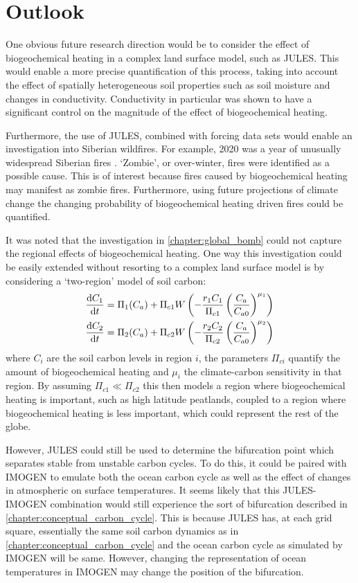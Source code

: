 \section{Outlook}
One obvious future research direction would be to consider the effect of biogeochemical heating in a complex land surface model, such as JULES.
This would enable a more precise quantification of this process, taking into account the effect of spatially heterogeneous soil properties such as
soil moisture and changes in conductivity. Conductivity in particular was shown to have a significant control on the magnitude of the effect of biogeochemical heating.

Furthermore, the use of JULES, combined with forcing data sets would enable an investigation into Siberian wildfires. For example, 2020 was a year of unusually widespread
Siberian fires \parencite{Witze2020}. `Zombie', or over-winter, fires were identified as a possible cause. This is of interest because fires
caused by biogeochemical heating may manifest as zombie fires.
Furthermore, using future projections of climate change the changing probability of biogeochemical heating driven fires could be quantified.

It was noted that the investigation in \cref{chapter:global_bomb} could not capture the regional effects of biogeochemical heating. One way this investigation could be easily extended without
resorting to a complex land surface model is by considering a `two-region' model of soil carbon:
\begin{subequations}
  \label{eq:two_region_model}
  \begin{align}
    \dv{C_1}{t} &= \Pi_1(C_a) + \Pi_{c1} W\left(-\frac{r_1C_1}{\Pi_{c1}} \left(\frac{C_a}{C_{a0}}\right)^{\mu_1} \right) \\
    \dv{C_2}{t} &= \Pi_2(C_a) + \Pi_{c2} W\left(-\frac{r_2C_2}{\Pi_{c2}} \left(\frac{C_a}{C_{a0}}\right)^{\mu_2} \right) \\
  \end{align}
\end{subequations}
where $C_i$ are the soil carbon levels in region $i$, the parameters $\Pi_{ci}$ quantify the amount of biogeochemical heating and $\mu_i$ the climate-carbon sensitivity in that region. By assuming
$\Pi_{c1} \ll \Pi_{c2}$ this then models a region where biogeochemical heating is important, such as high latitude peatlands, coupled to a region where biogeochemical heating is less important,
which could represent the rest of the globe.

However, JULES could still be used to determine the bifurcation point which separates stable from unstable carbon cycles. To do this, it could be paired with IMOGEN to emulate both the
ocean carbon cycle as well as the effect of changes in atmospheric  on surface temperatures. It seems likely that this JULES-IMOGEN combination would still experience the sort of
bifurcation described in \cref{chapter:conceptual_carbon_cycle}. This is because JULES has, at each grid square, essentially the same soil carbon dynamics as in \cref{chapter:conceptual_carbon_cycle}
and the ocean carbon cycle as simulated by IMOGEN will be same. However, changing the representation of ocean temperatures in IMOGEN may change the position of the bifurcation.
 
